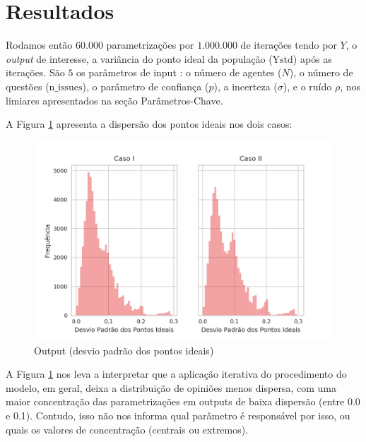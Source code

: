 \section{Resultados}

Rodamos então \(60.000\) parametrizações por \(1.000.000\) de iterações tendo
por \(Y\), o \textit{output} de interesse, a variância do ponto ideal da
população (\(\text{Ystd}\)) após as iterações. São \(5\) os parâmetros de input
: o número de agentes (\(N\)), o número de questões (\(\text{n\_issues}\)), o
parâmetro de confiança (\(p\)), a incerteza (\(\sigma\)), e o ruído \(\rho\), nos
limiares apresentados na seção Parâmetros-Chave.


A Figura \ref{fig:Yshist} apresenta a dispersão dos pontos ideais nos dois casos:
\begin{figure}[H]
  \centering
  \includegraphics{ims/distYs.png}
  \caption{Output (desvio padrão dos pontos ideais) }
  \label{fig:Yshist}
\end{figure}

A Figura \ref{fig:Yshist}  nos leva a interpretar  que a aplicação iterativa do
procedimento do modelo, em geral, deixa a distribuição de opiniões menos
dispersa, com uma maior concentração das parametrizações em outputs de baixa
dispersão (entre 0.0 e 0.1). Contudo, isso não nos informa qual parâmetro é
responsável por isso, ou quais os valores de concentração (centrais ou extremos).



